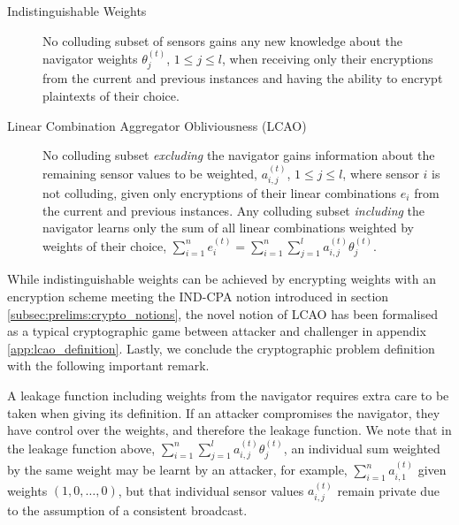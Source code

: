 \begin{description}
    \item[Indistinguishable Weights] No colluding subset of sensors gains any new knowledge about the navigator weights $\theta^{(t)}_j$, $1\leq j\leq l$, when receiving only their encryptions from the current and previous instances and having the ability to encrypt plaintexts of their choice.
    \item[Linear Combination Aggregator Obliviousness (LCAO)] No colluding subset \textit{excluding} the navigator gains information about the remaining sensor values to be weighted, $a^{(t)}_{i,j}$, $1\leq j\leq l$, where sensor $i$ is not colluding, given only encryptions of their linear combinations $e_i$ from the current and previous instances. Any colluding subset \textit{including} the navigator learns only the sum of all linear combinations weighted by weights of their choice, $\sum^{n}_{i=1}e_i^{(t)}=\sum^{n}_{i=1}\sum^{l}_{j=1} a^{(t)}_{i,j}\theta^{(t)}_j$.
\end{description}
While indistinguishable weights can be achieved by encrypting weights with an encryption scheme meeting the IND-CPA notion introduced in section \ref{subsec:prelims:crypto_notions}, the novel notion of LCAO has been formalised as a typical cryptographic game between attacker and challenger in appendix \ref{app:lcao_definition}. Lastly, we conclude the cryptographic problem definition with the following important remark.
\begin{remark}
    A leakage function including weights from the navigator requires extra care to be taken when giving its definition. If an attacker compromises the navigator, they have control over the weights, and therefore the leakage function. We note that in the leakage function above, $\sum^n_{i=1}\sum^l_{j=1}a^{(t)}_{i,j}\theta^{(t)}_j$, an individual sum weighted by the same weight may be learnt by an attacker, for example, $\sum^n_{i=1}a^{(t)}_{i,1}$ given weights $(1,0,\dots,0)$, but that individual sensor values $a^{(t)}_{i,j}$ remain private due to the assumption of a consistent broadcast.
\end{remark}

% 
% 

